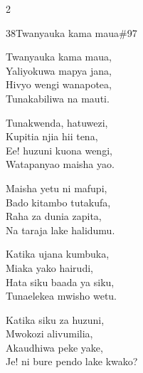 \begin{multicols}{2}
\begin{hymn}{38}{Twanyauka kama maua}{\#97}
\begin{stanza}
Twanyauka kama maua,\\
Yaliyokuwa mapya jana,\\
Hivyo wengi wanapotea,\\
Tunakabiliwa na mauti.
\end{stanza}
\begin{chorus}
Tunakwenda, hatuwezi,\\
Kupitia njia hii tena,\\
Ee! huzuni kuona wengi,\\
Watapanyao maisha yao.
\end{chorus}
\begin{stanza}
Maisha yetu ni mafupi,\\
Bado kitambo tutakufa,\\
Raha za dunia zapita,\\
Na taraja lake halidumu.
\end{stanza}
\begin{stanza}
Katika ujana kumbuka,\\
Miaka yako hairudi,\\
Hata siku baada ya siku,\\
Tunaelekea mwisho wetu.
\end{stanza}
\begin{stanza}
Katika siku za huzuni,\\
Mwokozi alivumilia,\\
Akaudhiwa peke yake,\\
Je! ni bure pendo lake kwako?
\end{stanza}
\end{hymn}


\end{multicols}
